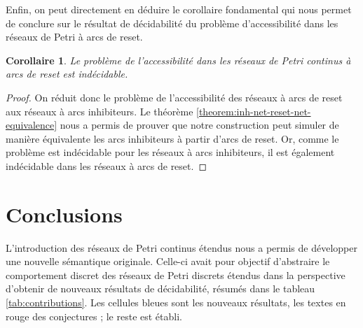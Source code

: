 \documentclass{article}
\newtheorem{corollary}{Corollaire}
\theoremstyle{remark}
\theoremstyle{remark}
\begin{document}
Enfin, on peut directement en déduire le corollaire fondamental qui nous permet de conclure sur le résultat de décidabilité du problème d'accessibilité dans les réseaux de Petri à arcs de reset.

\begin{corollary}
    \label{corollary:reset-cepn-undecidable}
    Le problème de l'accessibilité dans les réseaux de Petri continus à arcs de reset est indécidable.
\end{corollary}

\begin{proof}
    On réduit donc le problème de l'accessibilité des réseaux à arcs de reset aux réseaux à arcs inhibiteurs. Le théorème \ref{theorem:inh-net-reset-net-equivalence} nous a permis de prouver que notre construction peut simuler de manière équivalente les arcs inhibiteurs à partir d'arcs de reset. Or, comme le problème est indécidable pour les réseaux à arcs inhibiteurs, il est également indécidable dans les réseaux à arcs de reset.
\end{proof}

\newpage

\section{Conclusions}

L'introduction des réseaux de Petri continus étendus nous a permis de développer une nouvelle sémantique originale. Celle-ci avait pour objectif d'abstraire le comportement discret des réseaux de Petri discrets étendus dans la perspective d'obtenir de nouveaux résultats de décidabilité, résumés dans le tableau \ref{tab:contributions}. Les cellules bleues sont les nouveaux résultats, les textes en rouge des conjectures ; le reste est établi.
\end{document}
